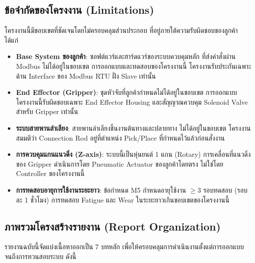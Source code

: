 \subsection{ข้อจำกัดของโครงงาน (Limitations)}
\label{subsec:limitations}

โครงงานนี้มีขอบเขตที่ชัดเจนโดยไม่ครอบคลุมส่วนประกอบ
ที่อยู่ภายใต้ความรับผิดชอบของลูกค้า ได้แก่

\begin{itemize}
  \item \textbf{Base System ของลูกค้า}:
        ซอฟต์แวร์และฮาร์ดแวร์ของระบบควบคุมหลัก
        ที่ส่งคำสั่งผ่าน Modbus ไม่ได้อยู่ในขอบเขต
        การออกแบบและทดสอบของโครงงานนี้
        โครงงานรับประกันเฉพาะด้าน Interface
        ของ Modbus RTU ฝั่ง Slave เท่านั้น

  \item \textbf{End Effector (Gripper)}:
        ชุดหัวจับที่ลูกค้ากำหนดไม่ได้อยู่ในขอบเขต
        การออกแบบ โครงงานนี้รับผิดชอบเฉพาะ
        End Effector Housing และสัญญาณควบคุม
        Solenoid Valve สำหรับ Gripper เท่านั้น

  \item \textbf{ระบบสายพานลำเลียง}:
        สายพานลำเลียงชิ้นงานต้นทางและปลายทาง
        ไม่ได้อยู่ในขอบเขต โครงงานสมมติว่า
        Connection Rod อยู่ที่ตำแหน่ง Pick/Place
        ที่กำหนดไว้แล้วก่อนสั่งงาน

  \item \textbf{การควบคุมแกนแนวดิ่ง (Z-axis)}:
        ระบบนี้เป็นหุ่นยนต์ 1 แกน (Rotary)
        การเคลื่อนที่แนวดิ่งของ Gripper
        ดำเนินการโดย Pneumatic Actuator
        ของลูกค้าโดยตรง ไม่ใช่โดย Controller
        ของโครงงานนี้

  \item \textbf{การทดสอบอายุการใช้งานระยะยาว}:
        ข้อกำหนด M5 กำหนดอายุใช้งาน
        $\geq 3$ รอบทดสอบ (รอบละ 1 ชั่วโมง)
        การทดสอบ Fatigue และ Wear
        ในระยะยาวเกินขอบเขตของโครงงานนี้
\end{itemize}

\subsection{ภาพรวมโครงสร้างรายงาน (Report Organization)}
\label{subsec:report_org}

รายงานฉบับนี้จัดแบ่งเนื้อหาออกเป็น 7 บทหลัก เพื่อให้ครอบคลุมการดำเนินงานตั้งแต่การออกแบบจนถึงการทวนสอบระบบ ดังนี้

